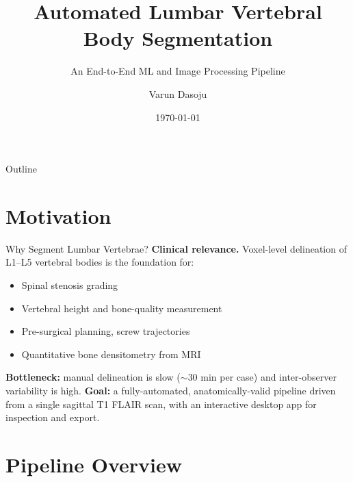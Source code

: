 \documentclass[aspectratio=169,11pt]{beamer}
\title[L1--L5 Segmentation]{Automated Lumbar Vertebral Body Segmentation}
\subtitle{An End-to-End ML and Image Processing Pipeline}
\author{Varun Dasoju}
\institute[Image Processing]{Term Project --- Image Processing}
\date{\today}
\begin{document}
\begin{frame}[plain]
  \titlepage
\end{frame}

\begin{frame}{Outline}
  \tableofcontents
\end{frame}

\section{Motivation}

\begin{frame}{Why Segment Lumbar Vertebrae?}
  \textbf{Clinical relevance.} Voxel-level delineation of L1--L5 vertebral
  bodies is the foundation for:
  \begin{itemize}
    \item Spinal stenosis grading
    \item Vertebral height and bone-quality measurement
    \item Pre-surgical planning, screw trajectories
    \item Quantitative bone densitometry from MRI
  \end{itemize}
  \vspace{0.6em}
  \textbf{Bottleneck:} manual delineation is slow ($\sim$30 min per case)
  and inter-observer variability is high.
  \vspace{0.6em}
  \textbf{Goal:} a fully-automated, anatomically-valid pipeline driven from
  a single sagittal T1 FLAIR scan, with an interactive desktop app for
  inspection and export.
\end{frame}

\section{Pipeline Overview}
\end{document}
